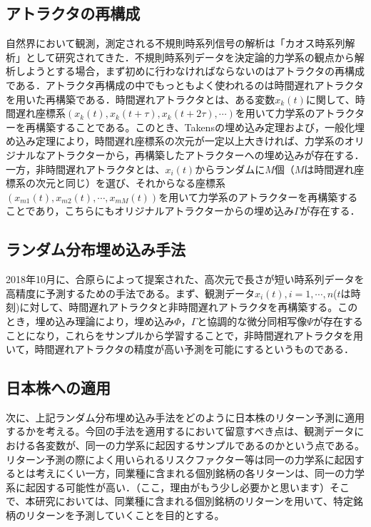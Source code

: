 \documentclass[JEL]{AEA}
\begin{document}
\subsection{アトラクタの再構成}
自然界において観測，測定される不規則時系列信号の解析は「カオス時系列解析」として研究されてきた．不規則時系列データを決定論的力学系の観点から解析しようとする場合，まず初めに行わなければならないのはアトラクタの再構成である\cite{sauer}．アトラクタ再構成の中でもっともよく使われるのは時間遅れアトラクタを用いた再構築である．時間遅れアトラクタとは、ある変数$x_{k}(t)$に関して、時間遅れ座標系$(x_{k}(t),x_{k}(t+\tau),x_{k}(t+2\tau),\cdots)$を用いて力学系のアトラクターを再構築することである。このとき、Takensの埋め込み定理\cite{takens}および，一般化埋め込み定理\cite{sauer}により，時間遅れ座標系の次元が一定以上大きければ、力学系のオリジナルなアトラクターから，再構築したアトラクターへの埋め込みが存在する．
一方，非時間遅れアトラクタとは、$x_{i}(t)$からランダムに$M$個（$M$は時間遅れ座標系の次元と同じ）を選び、それからなる座標系$(x_{m1}(t),x_{m2}(t),\cdots,x_{mM}(t))$を用いて力学系のアトラクターを再構築することであり，こちらにもオリジナルアトラクターからの埋め込み$\Gamma$が存在する．

\subsection{ランダム分布埋め込み手法}
2018年10月に、合原ら\cite{aihara}によって提案された、高次元で長さが短い時系列データを高精度に予測するための手法である。まず、観測データ$x_{i}(t),i={1,\cdots,n}$($t$は時刻)に対して、時間遅れアトラクタと非時間遅れアトラクタを再構築する。このとき，埋め込み理論により，埋め込み$\Phi$，$\Gamma$と協調的な微分同相写像$\Psi$が存在することになり\cite{sauer}，これらをサンプルから学習することで，非時間遅れアトラクタを用いて，時間遅れアトラクタの精度が高い予測を可能にするというものである．

\subsection{日本株への適用}

次に、上記ランダム分布埋め込み手法をどのように日本株のリターン予測に適用するかを考える。今回の手法を適用するにおいて留意すべき点は、観測データにおける各変数が、同一の力学系に起因するサンプルであるのかという点である。
リターン予測の際によく用いられるリスクファクター等は同一の力学系に起因するとは考えにくい一方，同業種に含まれる個別銘柄の各リターンは、同一の力学系に起因する可能性が高い．（ここ，理由がもう少し必要かと思います）そこで、本研究においては、同業種に含まれる個別銘柄のリターンを用いて、特定銘柄のリターンを予測していくことを目的とする。
\end{document}
